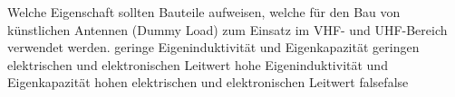     {Welche Eigenschaft sollten Bauteile aufweisen, welche für den Bau von künstlichen Antennen (Dummy Load) zum Einsatz im VHF- und UHF-Bereich verwendet werden.}
    {geringe Eigeninduktivität und Eigenkapazität}
    {geringen elektrischen und elektronischen Leitwert}
    {hohe Eigeninduktivität und Eigenkapazität}
    {hohen elektrischen und elektronischen Leitwert}
    {false}{false}